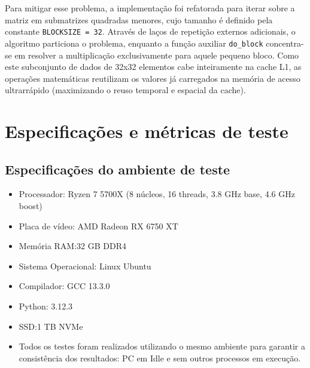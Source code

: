 \documentclass[12pt]{article}
\begin{document}
Para mitigar esse problema, a implementação foi refatorada para iterar sobre a matriz em submatrizes quadradas menores, cujo tamanho é definido pela constante \texttt{BLOCKSIZE = 32}. Através de laços de repetição externos adicionais, o algoritmo particiona o problema, enquanto a função auxiliar \texttt{do\_block} concentra-se em resolver a multiplicação exclusivamente para aquele pequeno bloco. Como este subconjunto de dados de 32x32 elementos cabe inteiramente na cache L1, as operações matemáticas reutilizam os valores já carregados na memória de acesso ultrarrápido (maximizando o reuso temporal e espacial da cache).

\section{Especificações e métricas de teste}
\subsection{Especificações do ambiente de teste}
    \begin{itemize}
        \item Processador: Ryzen 7 5700X (8 núcleos, 16 threads, 3.8 GHz base, 4.6 GHz boost)
        \item Placa de vídeo: AMD Radeon RX 6750 XT
        \item Memória RAM:\@32 GB DDR4
        \item Sistema Operacional: Linux Ubuntu
        \item Compilador: GCC 13.3.0
        \item Python: 3.12.3
        \item SSD:\@1 TB NVMe
        \item Todos os testes foram realizados utilizando o mesmo ambiente para garantir a consistência dos resultados: PC em Idle e sem outros processos em execução.
    \end{itemize}
\end{document}
